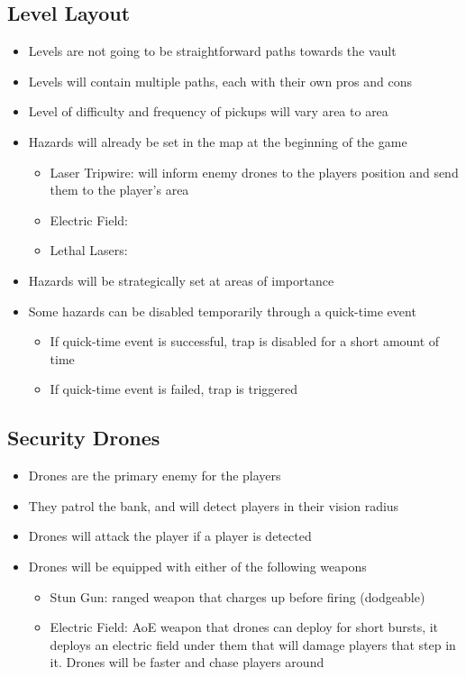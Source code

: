 \documentclass[14pt]{report}
\begin{document}
\subsection{Level Layout}
\begin{itemize}
    \item Levels are not going to be straightforward paths towards the vault
    \item Levels will contain multiple paths, each with their own pros and cons
    \item Level of difficulty and frequency of pickups will vary area to area
    \item Hazards will already be set in the map at the beginning of the game
    \begin{itemize}
        \item Laser Tripwire: will inform enemy drones to the players position and send them to the player's area
        \item Electric Field: %
        \item Lethal Lasers: 
    \end{itemize}
    \item Hazards will be strategically set at areas of importance
    \item Some hazards can be disabled temporarily through a quick-time event
    \begin{itemize}
        \item If quick-time event is successful, trap is disabled for a short amount of time
        \item If quick-time event is failed, trap is triggered
    \end{itemize}
\end{itemize}

\subsection{Security Drones}
\begin{itemize}
    \item Drones are the primary enemy for the players
    \item They patrol the bank, and will detect players in their vision radius
    \item Drones will attack the player if a player is detected
    \item Drones will be equipped with either of the following weapons
    \begin{itemize}
        \item Stun Gun: ranged weapon that charges up before firing (dodgeable)
        \item Electric Field: AoE weapon that drones can deploy for short bursts, it deploys an electric field under them that will damage players that step in it. Drones will be faster and chase players around
    \end{itemize}
\end{itemize}
\end{document}

